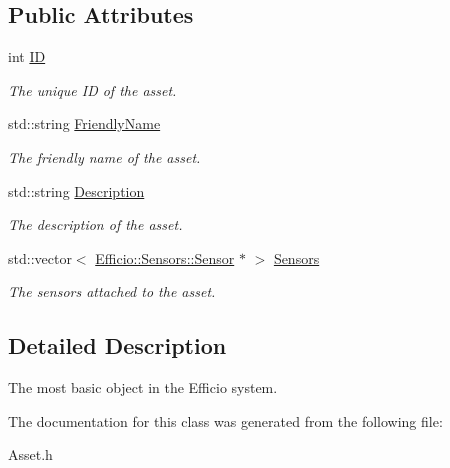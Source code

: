 \subsection*{Public Attributes}
\begin{DoxyCompactItemize}
\item 
int \hyperlink{class_efficio_1_1_asset_a1e5f8660c1b01f4f5d4ccb2b599b2afa}{ID}\hypertarget{class_efficio_1_1_asset_a1e5f8660c1b01f4f5d4ccb2b599b2afa}{}\label{class_efficio_1_1_asset_a1e5f8660c1b01f4f5d4ccb2b599b2afa}

\begin{DoxyCompactList}\small\item\em The unique ID of the asset. \end{DoxyCompactList}\item 
std\+::string \hyperlink{class_efficio_1_1_asset_abe108e35fcfba515f555136edb3b17a3}{Friendly\+Name}\hypertarget{class_efficio_1_1_asset_abe108e35fcfba515f555136edb3b17a3}{}\label{class_efficio_1_1_asset_abe108e35fcfba515f555136edb3b17a3}

\begin{DoxyCompactList}\small\item\em The friendly name of the asset. \end{DoxyCompactList}\item 
std\+::string \hyperlink{class_efficio_1_1_asset_a318e4f8c3bde1b1acd27c9a871de3486}{Description}\hypertarget{class_efficio_1_1_asset_a318e4f8c3bde1b1acd27c9a871de3486}{}\label{class_efficio_1_1_asset_a318e4f8c3bde1b1acd27c9a871de3486}

\begin{DoxyCompactList}\small\item\em The description of the asset. \end{DoxyCompactList}\item 
std\+::vector$<$ \hyperlink{class_efficio_1_1_sensors_1_1_sensor}{Efficio\+::\+Sensors\+::\+Sensor} $\ast$ $>$ \hyperlink{class_efficio_1_1_asset_a5ebc1f9669f3538d2cd60b8d4b3ad73a}{Sensors}\hypertarget{class_efficio_1_1_asset_a5ebc1f9669f3538d2cd60b8d4b3ad73a}{}\label{class_efficio_1_1_asset_a5ebc1f9669f3538d2cd60b8d4b3ad73a}

\begin{DoxyCompactList}\small\item\em The sensors attached to the asset. \end{DoxyCompactList}\end{DoxyCompactItemize}


\subsection{Detailed Description}
The most basic object in the Efficio system. 

The documentation for this class was generated from the following file\+:\begin{DoxyCompactItemize}
\item 
Asset.\+h\end{DoxyCompactItemize}
